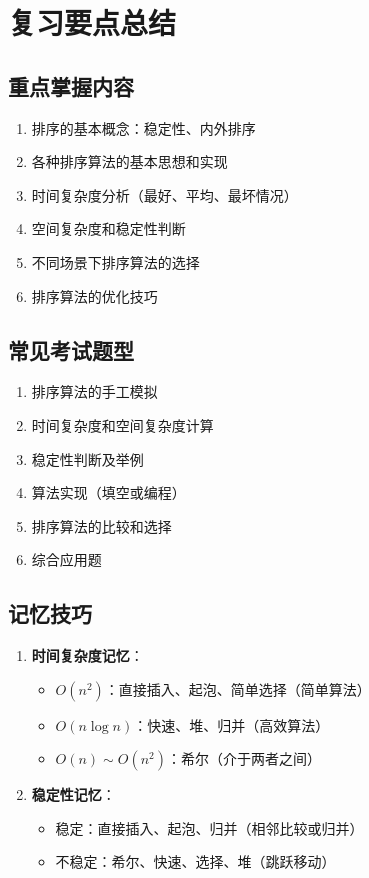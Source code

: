 \documentclass[12pt,a4paper]{amsart}
\begin{document}
\section{复习要点总结}

\subsection{重点掌握内容}

\begin{enumerate}
\item 排序的基本概念：稳定性、内外排序
\item 各种排序算法的基本思想和实现
\item 时间复杂度分析（最好、平均、最坏情况）
\item 空间复杂度和稳定性判断
\item 不同场景下排序算法的选择
\item 排序算法的优化技巧
\end{enumerate}

\subsection{常见考试题型}

\begin{enumerate}
\item 排序算法的手工模拟
\item 时间复杂度和空间复杂度计算
\item 稳定性判断及举例
\item 算法实现（填空或编程）
\item 排序算法的比较和选择
\item 综合应用题
\end{enumerate}

\subsection{记忆技巧}

\begin{enumerate}
\item \textbf{时间复杂度记忆}：
    \begin{itemize}
    \item $O(n^2)$：直接插入、起泡、简单选择（简单算法）
    \item $O(n\log n)$：快速、堆、归并（高效算法）
    \item $O(n) \sim O(n^2)$：希尔（介于两者之间）
    \end{itemize}

\item \textbf{稳定性记忆}：
    \begin{itemize}
    \item 稳定：直接插入、起泡、归并（相邻比较或归并）
    \item 不稳定：希尔、快速、选择、堆（跳跃移动）
    \end{itemize}
\end{enumerate}
\end{document}
